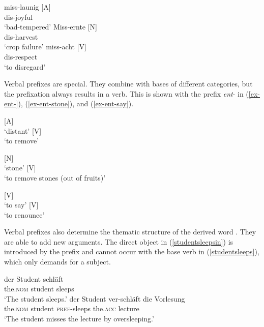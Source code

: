 \documentclass[output=paper
  ,nobabel
  ,draftmode
  ,colorlinks, citecolor=brown
]{langscibook}
\begin{document}
\eal\label{ex-miss}
\ex
\gll miss-launig  [A] \\ dis-joyful \\
\glt `bad-tempered'
\ex
\gll Miss-ernte [N] \\ dis-harvest \\
\glt `crop failure'
\ex
\gll miss-acht [V] \\ dis-respect \\
\glt `to disregard'
\zl

\noindent 
Verbal prefixes are special. They combine with bases of different categories, but the prefixation always results in a verb. This is shown with the prefix \emph{ent}- in (\ref{ex-ent-}), (\ref{ex-ent-stone}), and (\ref{ex-ent-say}).

\eal\label{ex-ent-}
\ex {} [A]\\ `distant'
\ex {} [V]\\ `to remove'
\zl

\eal\label{ex-ent-stone}
\ex {} [N]\\ `stone'
\ex {} [V]\\ `to remove stones (out of fruits)'
\zl

\eal\label{ex-ent-say}
\ex {} [V]\\ `to say'
\ex {} [V]\\ `to renounce'
\zl

\noindent Verbal prefixes also determine the thematic structure of the derived word \citep[cf.\ e.g.][]{Wunderlich1987}. They are able to add new arguments. The direct object in (\ref{studentsleepsin}) is introduced by the prefix and cannot occur with the base verb in (\ref{studentsleeps}), which only demands for a subject.

\eal
\ex\label{studentsleeps}
\gll der               Student   schläft    \\ 
     the.\textsc{nom}  student   sleeps   \\
\glt `The student sleeps.'
\ex\label{studentsleepsin}
\gll der             Student   ver-schläft   die           Vorlesung \\ the.\textsc{nom}   student   \textsc{pref}-sleeps   the.\textsc{acc}   lecture \\
\glt `The student misses the lecture by oversleeping.'
\zl
\end{document}
